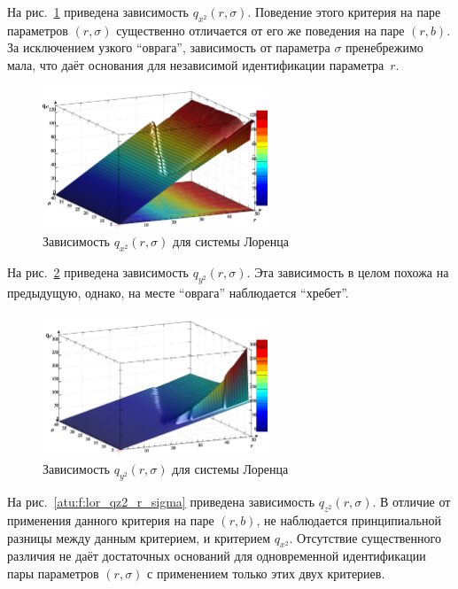 На рис.~\ref{atu:f:lor_qx2_r_sigma} приведена зависимость
$q_{x^2}(r,\sigma)$.
Поведение этого критерия на паре параметров $(r,\sigma)$
существенно отличается от его же поведения на паре $(r,b)$.
За исключением узкого ``оврага'', зависимость от параметра $\sigma$
пренебрежимо мала, что даёт основания для
независимой идентификации параметра~$r$.

\begin{figure}[ht!]
  \centerline{  \includegraphics[width=0.60\textwidth]{p/cha/lor/q2d/lor_qx2_r_sigma.png}  }
  \caption{Зависимость $q_{x^2}(r,\sigma)$ для системы Лоренца}
  \label{atu:f:lor_qx2_r_sigma}
\end{figure}


На рис.~\ref{atu:f:lor_qy2_r_sigma} приведена зависимость
$q_{y^2}(r,\sigma)$.
Эта зависимость в целом похожа на предыдущую,
однако, на месте ``оврага'' наблюдается ``хребет''.

\begin{figure}[ht!]
  \centerline{  \includegraphics[width=0.60\textwidth]{p/cha/lor/q2d/lor_qy2_r_sigma.png}  }
  \caption{Зависимость $q_{y^2}(r,\sigma)$ для системы Лоренца}
  \label{atu:f:lor_qy2_r_sigma}
\end{figure}

На рис.~\ref{atu:f:lor_qz2_r_sigma} приведена зависимость
$q_{z^2}(r,\sigma)$. В отличие от применения данного
критерия на паре $(r,b)$, не наблюдается принципиальной
разницы между данным критерием, и критерием $q_{x^2}$.
Отсутствие существенного различия не даёт достаточных
оснований для одновременной идентификации
пары параметров $(r,\sigma)$ с применением только этих
двух критериев.


